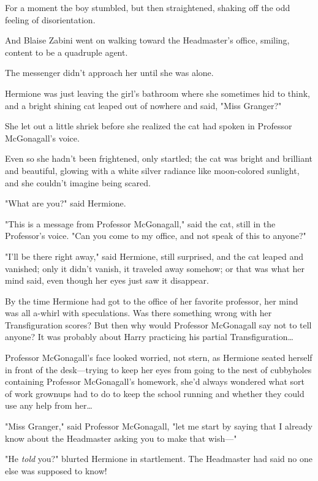 For a moment the boy stumbled, but then straightened, shaking off the odd
feeling of disorientation.

And Blaise Zabini went on walking toward the Headmaster's office, smiling,
content to be a quadruple agent.

The messenger didn't approach her until she was alone.

Hermione was just leaving the girl's bathroom where she sometimes hid to think,
and a bright shining cat leaped out of nowhere and said, "Miss Granger?"

She let out a little shriek before she realized the cat had spoken in Professor
McGonagall's voice.

Even so she hadn't been frightened, only startled; the cat was bright and
brilliant and beautiful, glowing with a white silver radiance like moon-colored
sunlight, and she couldn't imagine being scared.

"What are you?" said Hermione.

"This is a message from Professor McGonagall," said the cat, still in the
Professor's voice. "Can you come to my office, and not speak of this to anyone?"

"I'll be there right away," said Hermione, still surprised, and the cat leaped
and vanished; only it didn't vanish, it traveled away somehow; or that was what
her mind said, even though her eyes just saw it disappear.

By the time Hermione had got to the office of her favorite professor, her mind
was all a-whirl with speculations. Was there something wrong with her
Transfiguration scores? But then why would Professor McGonagall say not to tell
anyone? It was probably about Harry practicing his partial
Transfiguration{\ldots}

Professor McGonagall's face looked worried, not stern, as Hermione seated
herself in front of the desk---trying to keep her eyes from going to the nest
of cubbyholes containing Professor McGonagall's homework, she'd always wondered
what sort of work grownups had to do to keep the school running and whether
they could use any help from her{\ldots}

"Miss Granger," said Professor McGonagall, "let me start by saying that I
already know about the Headmaster asking you to make that wish---"

"He \emph{told} you?" blurted Hermione in startlement. The Headmaster had said
no one else was supposed to know!

